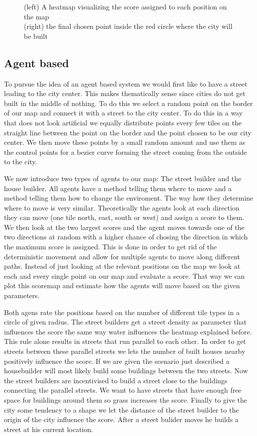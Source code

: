\documentclass{scrartcl}
\begin{document}
\begin{figure}
  \caption{(left) A heatmap visualizing the score assigned to each position on the map\\
          (right) the final chosen point inside the red circle where the city will be built}
\end{figure}

\subsection{Agent based}
To pursue the idea of an agent based system we would first like to have a street
leading to the city center. This makes thematically sense since cities do not get
built in the middle of nothing. To do this we select a random point on the border
of our map and connect it with a street to the city center. To do this in a way
that does not look artificial we equally distribute points every few tiles on
the straight line between the point on the border and the point chosen to be our
city center. We then move these points by a small random amount and use them as the
control points for a bezier curve forming the street coming from the outside to
the city.

We now introduce two types of agents to our map: The street builder and the house builder.
All agents have a method telling them where to move and a method telling them
how to change the enviroment. The way how they determine where to move is very similar.
Theoretically the agents look at each direction they can move (one tile north, east, south or west)
and assign a score to them. We then look at the two largest scores and the agent
moves towards one of the two directions at random with a higher chance of chosing
the direction in which the maximum score is assigned. This is done in order to
get rid of the deterministic movement and allow for multiple agents to move along
different paths. Instead of just looking at the relevant positions on the map we
look at each and every single point on our map and evaluate a score. That way we
can plot this scoremap and estimate how the agents will move based on the given
parameters.

Both agens rate the positions based on the number of different tile types in a
circle of given radius. The street builders get a street density as parameter
that influences the score the same way water influences the heatmap explained before.
This rule alone results in streets that run parallel to each other. In order to
get streets between these parallel streets we lets the number of built houses nearby
positively influence the score. If we are given the scenario just described
a housebuilder will most likely build some buildings between the two streets.
Now the street builders are incentivised to build a street close to the buildings
connecting the parallel streets.
We want to have streets that have enough free space for buildings around them
so grass increases the score. Finally to give the city some tendency to a shape
we let the distance of the street builder to the origin of the city influence the score.
After a street bulider moves he builds a street at his current location.
\end{document}
